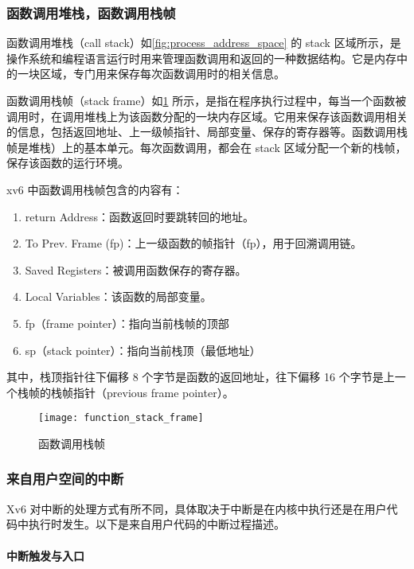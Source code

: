 \subsubsection{函数调用堆栈，函数调用栈帧}

函数调用堆栈（call stack）如\cref{fig:process_address_space} 的 stack 区域所示，是操作系统和编程语言运行时用来管理函数调用和返回的一种数据结构。它是内存中的一块区域，专门用来保存每次函数调用时的相关信息。

函数调用栈帧（stack frame）如\cref{fig:function_stack_frame} 所示，是指在程序执行过程中，每当一个函数被调用时，在调用堆栈上为该函数分配的一块内存区域。它用来保存该函数调用相关的信息，包括返回地址、上一级帧指针、局部变量、保存的寄存器等。函数调用栈帧是堆栈）上的基本单元。每次函数调用，都会在 stack 区域分配一个新的栈帧，保存该函数的运行环境。

xv6 中函数调用栈帧包含的内容有：

\begin{enumerate}
	\item return Address：函数返回时要跳转回的地址。
	\item To Prev. Frame (fp)：上一级函数的帧指针（fp），用于回溯调用链。
	\item Saved Registers：被调用函数保存的寄存器。
	\item Local Variables：该函数的局部变量。
	\item fp（frame pointer）：指向当前栈帧的顶部
	\item sp（stack pointer）：指向当前栈顶（最低地址）
\end{enumerate}

其中，栈顶指针往下偏移 8 个字节是函数的返回地址，往下偏移 16 个字节是上一个栈帧的栈帧指针（previous frame pointer）。

\begin{figure}[!htb]
	\centering
	\texttt{[image: function\_stack\_frame]}
	\caption{函数调用栈帧}
	\label{fig:function_stack_frame}
\end{figure}

\subsubsection{来自用户空间的中断}

Xv6 对中断的处理方式有所不同，具体取决于中断是在内核中执行还是在用户代码中执行时发生。以下是来自用户代码的中断过程描述。

\paragraph{中断触发与入口}

